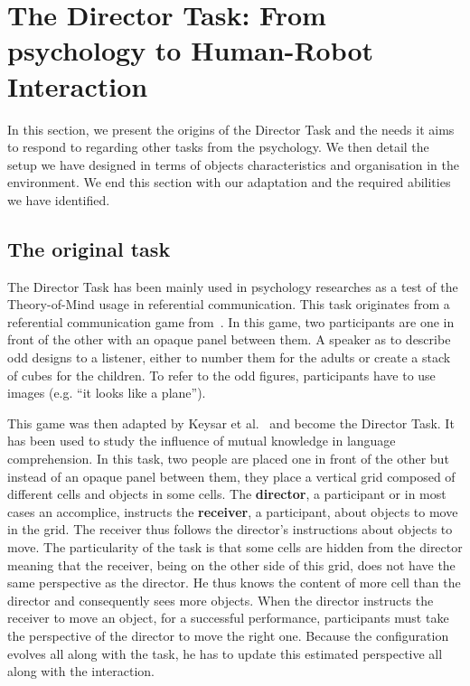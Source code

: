 \section[From psychology to Human-Robot Interaction]{The Director Task: From psychology to Human-Robot Interaction}

In this section, we present the origins of the Director Task and the needs it aims to respond to regarding other tasks from the psychology. We then detail the setup we have designed in terms of objects characteristics and organisation in the environment. We end this section with our adaptation and the required abilities we have identified.

\subsection{The original task}

The Director Task has been mainly used in psychology researches as a test of the Theory-of-Mind usage in referential communication. This task originates from a referential communication game from~\cite{krauss_1977_social}. In this game, two participants are one in front of the other with an opaque panel between them. A speaker as to describe odd designs to a listener, either to number them for the adults or create a stack of cubes for the children. To refer to the odd figures, participants have to use images (e.g. ``it looks like a plane'').

This game was then adapted by Keysar et al.~\cite{keysar_2000_taking} and become the Director Task. It has been used to study the influence of mutual knowledge in language comprehension. In this task, two people are placed one in front of the other but instead of an opaque panel between them, they place a vertical grid composed of different cells and objects in some cells. The \textbf{director}, a participant or in most cases an accomplice, instructs the \textbf{receiver}, a participant, about objects to move in the grid. The receiver thus follows the director's instructions about objects to move. The particularity of the task is that some cells are hidden from the director meaning that the receiver, being on the other side of this grid, does not have the same perspective as the director. He thus knows the content of more cell than the director and consequently sees more objects. When the director instructs the receiver to move an object, for a successful performance, participants must take the perspective of the director to move the right one. Because the configuration evolves all along with the task, he has to update this estimated perspective all along with the interaction.


